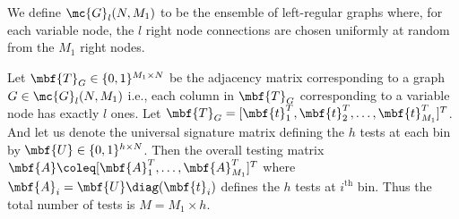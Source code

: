 \documentclass[conference,twocolumn]{IEEEtran}
\begin{document}
\begin{definition}
We define $\mc{G}_l(N,M_1)$ to be the ensemble of left-regular graphs where, for each variable node, the $l$ right node connections are chosen uniformly at random from the $M_1$ right nodes.
\end{definition}

 Let $\mbf{T}_{G}\in\{0,1\}^{M_1\times N }$ be the adjacency matrix corresponding to a graph $G\in\mc{G}_l(N,M_1)$ i.e., each column in $\mbf{T}_{G}$ corresponding to a variable node has exactly $l$ ones. Let $\mbf{T}_{G}=[\mbf{t}^{T}_1,\mbf{t}^{T}_{2},\dots, \mbf{t}^{T}_{M_1}]^{T}$. And let us denote the universal signature matrix defining the $h$ tests at each bin by $\mbf{U}\in\{0,1\}^{h\times N}$. Then the overall testing matrix $\mbf{A}\coleq [\mbf{A}_{1}^{T},\ldots,\mbf{A}_{M_{1}}^{T}]^T$ where $\mbf{A}_{i}=\mbf{U} \diag (\mbf{t}_i)$ defines the $h$ tests at $i^{\text{th}}$ bin. Thus the total number of tests is $M=M_1\times h$.

 
\end{document}
